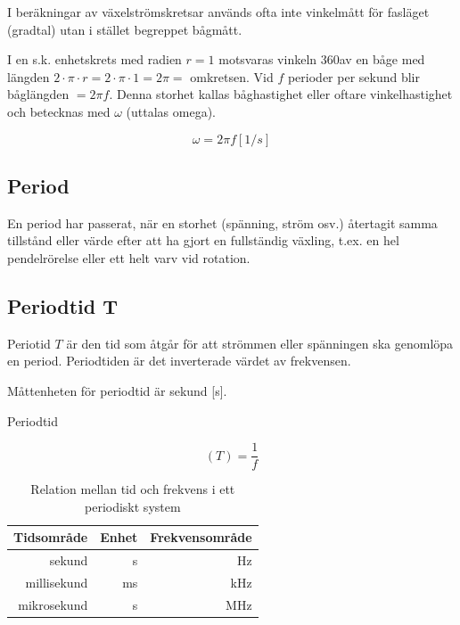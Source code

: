 I beräkningar av växelströmskretsar används ofta inte vinkelmått för fasläget
(gradtal) utan i stället begreppet bågmått.

I en s.k. enhetskrets med radien \(r = 1\) motsvaras vinkeln 360\degree av en
båge med längden \(2 \cdot \pi \cdot r= 2 \cdot \pi \cdot 1 = 2 \pi =\)
omkretsen.
Vid \(f\) perioder per sekund blir båglängden \(= 2\pi f\).
Denna storhet kallas båghastighet eller oftare vinkelhastighet och betecknas
med \(\omega\) (uttalas omega).

\[
\omega= 2\pi f \unit{[1/s]}
\]

\subsection{Period}

En period har passerat, när en storhet (spänning, ström osv.) återtagit samma
tillstånd eller värde efter att ha gjort en fullständig växling, t.ex. en hel
pendelrörelse eller ett helt varv vid rotation.

\subsection{Periodtid T}

Periotid \(T\) är den tid som åtgår för att strömmen eller spänningen ska
genomlöpa en period. Periodtiden är det inverterade värdet av frekvensen.

Måttenheten för periodtid är sekund [s].

Periodtid

\begin{equation*}
	(T) = \dfrac{1}{f}
\end{equation*} 


\begin{table}[h]
	\centering
	\begin{tabular}{rrr}
		 Tidsområde &     Enhet & Frekvensområde \\ \hline
		     sekund &         s &             Hz \\
		millisekund &        ms &            kHz \\
		mikrosekund & \textmu s &            MHz
	\end{tabular}
	\caption{Relation mellan tid och frekvens i ett periodiskt system}
\end{table}

